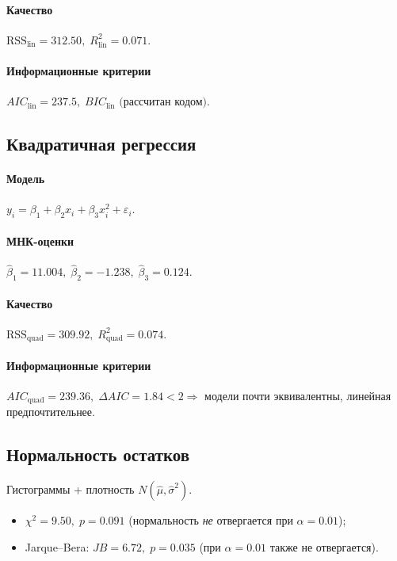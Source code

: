 \documentclass[12pt]{article}
\begin{document}
\paragraph{Качество} \(\text{RSS}_{\text{lin}} = 312.50,\; R^2_{\text{lin}}=0.071.\)

\paragraph{Информационные критерии}
\(
  AIC_{\text{lin}} = 237.5,\;
  BIC_{\text{lin}} \text{ (рассчитан кодом).}
\)

\subsection{Квадратичная регрессия}

\paragraph{Модель}
\(y_i=\beta_1+\beta_2x_i+\beta_3x_i^2+\varepsilon_i.\)

\paragraph{МНК-оценки}
\(\hat\beta_1=11.004,\;
  \hat\beta_2=-1.238,\;
  \hat\beta_3=0.124.\)

\paragraph{Качество}
\(\text{RSS}_{\text{quad}}=309.92,\;
  R^2_{\text{quad}}=0.074.\)

\paragraph{Информационные критерии}
\(AIC_{\text{quad}} = 239.36,\;
  \Delta AIC = 1.84 < 2\Rightarrow\)
модели почти эквивалентны, линейная предпочтительнее.

\subsection{Нормальность остатков}

Гистограммы + плотность \(N(\hat\mu,\hat\sigma^2)\).

\begin{itemize}
  \item \(\chi^2 = 9.50,\; p = 0.091\) (нормальность \emph{не} отвергается при \(\alpha=0.01\));
  \item Jarque–Bera: \(JB = 6.72,\; p = 0.035\) (при \(\alpha=0.01\) также не отвергается).
\end{itemize}
\end{document}
